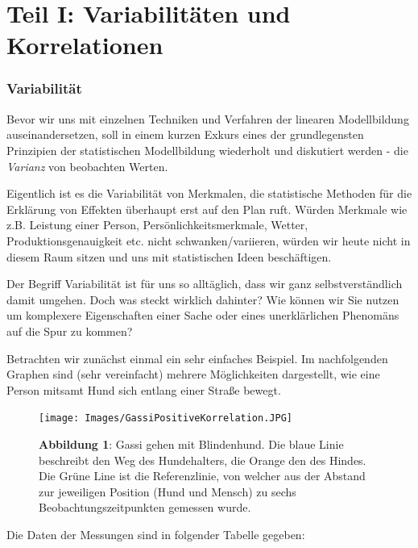 \documentclass[]{article}
\begin{document}
\hypertarget{part-teil-i-variabilitaten-und-korrelationen}{%
\part*{Teil I: Variabilitäten und Korrelationen}\label{part-teil-i-variabilitaten-und-korrelationen}}

\hypertarget{variabilitat}{%
\section*{Variabilität}\label{variabilitat}}

Bevor wir uns mit einzelnen Techniken und Verfahren der linearen Modellbildung auseinandersetzen, soll in einem kurzen Exkurs eines der grundlegensten Prinzipien der statistischen Modellbildung wiederholt und diskutiert werden - die \emph{Varianz} von beobachten Werten.

Eigentlich ist es die Variabilität von Merkmalen, die statistische Methoden für die Erklärung von Effekten überhaupt erst auf den Plan ruft. Würden Merkmale wie z.B. Leistung einer Person, Persönlichkeitsmerkmale, Wetter, Produktionsgenauigkeit etc. nicht schwanken/variieren, würden wir heute nicht in diesem Raum sitzen und uns mit statistischen Ideen beschäftigen.

Der Begriff Variabilität ist für uns so alltäglich, dass wir ganz selbstverständlich damit umgehen. Doch was steckt wirklich dahinter? Wie können wir Sie nutzen um komplexere Eigenschaften einer Sache oder eines unerklärlichen Phenomäns auf die Spur zu kommen?

Betrachten wir zunächst einmal ein sehr einfaches Beispiel. Im nachfolgenden Graphen sind (sehr vereinfacht) mehrere Möglichkeiten dargestellt, wie eine Person mitsamt Hund sich entlang einer Straße bewegt.

\begin{figure}
\centering
\texttt{[image: Images/GassiPositiveKorrelation.JPG]}
\caption{\textbf{Abbildung 1}: Gassi gehen mit Blindenhund. Die blaue Linie beschreibt den Weg des Hundehalters, die Orange den des Hindes. Die Grüne Line ist die Referenzlinie, von welcher aus der Abstand zur jeweiligen Position (Hund und Mensch) zu sechs Beobachtungszeitpunkten gemessen wurde.}
\end{figure}

Die Daten der Messungen sind in folgender Tabelle gegeben:
\end{document}
